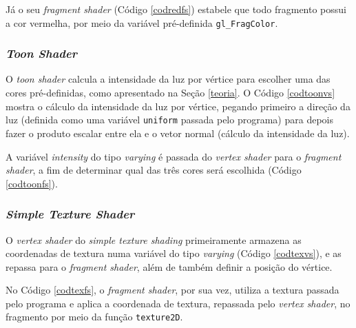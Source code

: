 	

	Já o seu \textit{fragment shader} (Código \ref{codredfs}) estabele que todo fragmento possui a cor vermelha, por meio da variável pré-definida \texttt{gl\_FragColor}.
	
	

\subsubsection{\textit{Toon Shader}}

	O  \textit{toon shader} calcula a intensidade da luz por vértice para escolher uma das cores pré-definidas, como apresentado na Seção \ref{teoria}. O Código  \ref{codtoonvs} mostra o cálculo da intensidade da luz por vértice, pegando primeiro a direção da luz (definida como uma variável \texttt{uniform} passada pelo programa) para depois fazer o produto escalar entre ela e o vetor normal (cálculo da intensidade da luz).  

	

	A variável \textit{intensity} do tipo \textit{varying} é passada do \textit{vertex shader} para o \textit{fragment shader}, a fim de determinar qual das três cores será escolhida (Código \ref{codtoonfs}). 
  
 	

\subsubsection{\textit{Simple Texture Shader}}

	O \textit{vertex shader} do \textit{simple texture shading} primeiramente armazena as coordenadas de textura numa variável do tipo \textit{varying} (Código \ref{codtexvs}), e as repassa para o \textit{fragment shader}, além de também definir a posição do vértice.  

	

	No Código \ref{codtexfs}, o \textit{fragment shader}, por sua vez, utiliza a textura passada pelo programa e aplica a coordenada de textura, repassada pelo \textit{vertex shader}, no fragmento por meio da função  \texttt{texture2D}.

